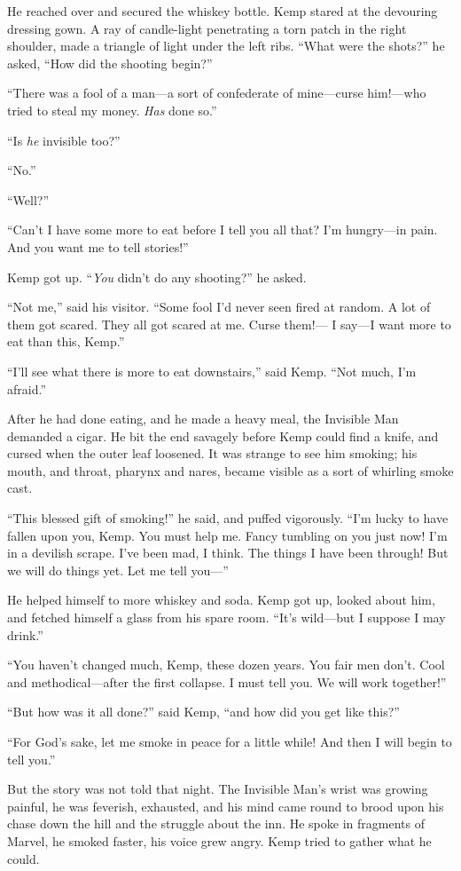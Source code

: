 He reached over and secured the whiskey bottle. Kemp stared at the devouring dressing gown. A ray of candle-light penetrating a torn patch in the right shoulder, made a triangle of light under the left ribs. “What were the shots?” he asked, “How did the shooting begin?”

“There was a fool of a man—a sort of confederate of mine—curse him!—who tried to steal my money. \emph{Has} done so.”

“Is \emph{he} invisible too?”

“No.”

“Well?”

“Can’t I have some more to eat before I tell you all that? I’m hungry—in pain. And you want me to tell stories!”

Kemp got up. “\emph{You} didn’t do any shooting?” he asked.

“Not me,” said his visitor. “Some fool I’d never seen fired at random. A lot of them got scared. They all got scared at me. Curse them!— I say—I want more to eat than this, Kemp.”

“I’ll see what there is more to eat downstairs,” said Kemp. “Not much, I’m afraid.”

After he had done eating, and he made a heavy meal, the Invisible Man demanded a cigar. He bit the end savagely before Kemp could find a knife, and cursed when the outer leaf loosened. It was strange to see him smoking; his mouth, and throat, pharynx and nares, became visible as a sort of whirling smoke cast.

“This blessed gift of smoking!” he said, and puffed vigorously. “I’m lucky to have fallen upon you, Kemp. You must help me. Fancy tumbling on you just now! I’m in a devilish scrape.  I’ve been mad, I think. The things I have been through! But we will do things yet. Let me tell you—”

He helped himself to more whiskey and soda. Kemp got up, looked about him, and fetched himself a glass from his spare room. “It’s wild—but I suppose I may drink.”

“You haven’t changed much, Kemp, these dozen years. You fair men don’t. Cool and methodical—after the first collapse. I must tell you. We will work together!”

“But how was it all done?” said Kemp, “and how did you get like this?”

“For God’s sake, let me smoke in peace for a little while! And then I will begin to tell you.”

But the story was not told that night. The Invisible Man’s wrist was growing painful, he was feverish, exhausted, and his mind came round to brood upon his chase down the hill and the struggle about the inn. He spoke in fragments of Marvel, he smoked faster, his voice grew angry. Kemp tried to gather what he could.

